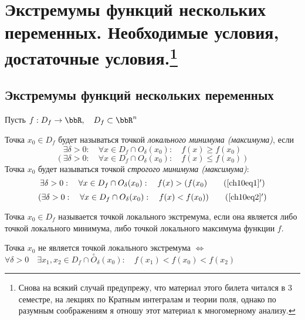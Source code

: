 \chapter[Экстремумы функций нескольких переменных. Необходимые условия, достаточные условия.]{Экстремумы функций нескольких переменных. Необходимые условия, достаточные условия.\footnote{Снова на всякий случай предупрежу, что материал этого билета читался в 3 семестре, на лекциях по \glqq Кратным интегралам и теории поля\grqq, однако по разумным соображениям я отношу этот материал к многомерному анализу.}}

\section{Экстремумы функций нескольких переменных}

Пусть $f: D_f \to \bbR, \quad D_f \subset \bbR^n$

\begin{defn}
Точка $x_0 \in D_f$ будет называться точкой \textit{локального минимума (максимума)}, если 
\begin{equation} \label{ch10eq1}
\exists \delta > 0: \quad \forall x \in D_f \cap O_\delta(x_0): \quad f(x) \ge f(x_0)
\end{equation} 
\begin{equation} \label{ch10eq2}
(\exists \delta > 0: \quad \forall x \in D_f \cap O_\delta(x_0): \quad f(x) \le f(x_0))
\end{equation} 
 Точка $x_0$ будет называться точкой \textit{строгого минимума (максимума)}:
 \begin{equation} \label{ch10eq1'}
\exists \delta > 0: \quad \forall x \in D_f \cap O_\delta(x_0): \quad f(x) > (f(x_0)
\tag{\ref{ch10eq1}$'$} 
\end{equation} 
\begin{equation} \label{ch10eq2'}
(\exists \delta > 0: \quad \forall x \in D_f \cap O_\delta(x_0): \quad f(x) < f(x_0))
\tag{\ref{ch10eq2}$'$} 
\end{equation} 
\end{defn}

\begin{defn}
Точка $x_0 \in D_f$ называется точкой локального экстремума, если она является либо точкой локального минимума, либо точкой локального максимума функции $f$.

Точка $x_0$ не является точкой локального экстремума $\Leftrightarrow$ $\forall \delta > 0 \quad \exists x_1, x_2 \in D_f \cap \overset{\circ}{O}_\delta(x_0): \quad f(x_1) < f(x_0) < f(x_2)$
\end{defn}
